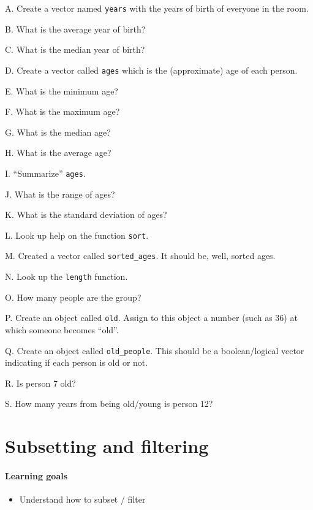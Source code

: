 \documentclass[
]{book}
\providecommand{\tightlist}{%
  \setlength{\itemsep}{0pt}\setlength{\parskip}{0pt}}
\begin{document}
A. Create a vector named \texttt{years} with the years of birth of everyone in the room.

B. What is the average year of birth?

C. What is the median year of birth?

D. Create a vector called \texttt{ages} which is the (approximate) age of each person.

E. What is the minimum age?

F. What is the maximum age?

G. What is the median age?

H. What is the average age?

I. ``Summarize'' \texttt{ages}.

J. What is the range of ages?

K. What is the standard deviation of ages?

L. Look up help on the function \texttt{sort}.

M. Created a vector called \texttt{sorted\_ages}. It should be, well, sorted ages.

N. Look up the \texttt{length} function.

O. How many people are the group?

P. Create an object called \texttt{old}. Assign to this object a number (such as 36) at which someone becomes ``old''.

Q. Create an object called \texttt{old\_people}. This should be a boolean/logical vector indicating if each person is old or not.

R. Is person 7 old?

S. How many years from being old/young is person 12?

\hypertarget{subsetting}{%
\chapter{Subsetting and filtering}\label{subsetting}}

\hypertarget{learning-goals-5}{%
\subsubsection*{Learning goals}\label{learning-goals-5}}

\begin{itemize}
\tightlist
\item
  Understand how to subset / filter
\end{itemize}
\end{document}
